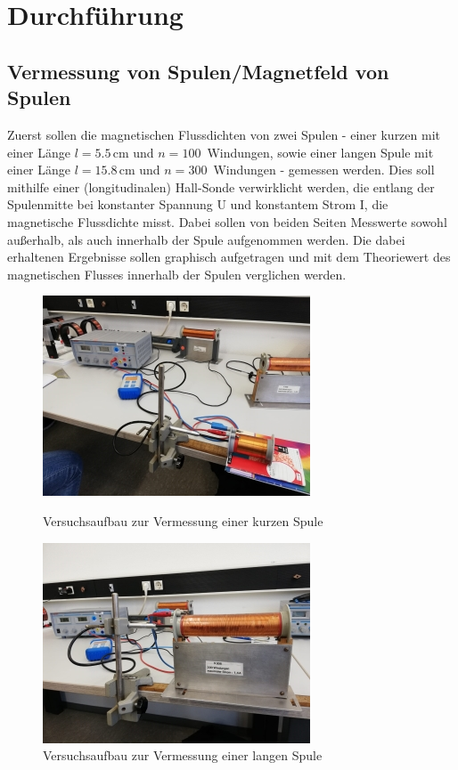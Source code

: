 \section{Durchführung}
\label{sec:Durchführung}

\subsection{Vermessung von Spulen/Magnetfeld von Spulen}

Zuerst sollen die magnetischen Flussdichten von zwei Spulen - einer kurzen mit einer Länge 
$l = 5.5\, \si{\centi\meter}$ und $n = 100\,$ Windungen, sowie einer langen Spule mit einer Länge
$l = 15.8\, \si{\cm}$ und $n = 300\,$ Windungen - gemessen werden. Dies soll mithilfe einer
(longitudinalen) Hall-Sonde verwirklicht werden, die entlang der Spulenmitte bei konstanter Spannung U und konstantem
Strom I, die magnetische Flussdichte misst. Dabei sollen von beiden Seiten Messwerte sowohl außerhalb, als auch
innerhalb der Spule aufgenommen werden.
Die dabei erhaltenen Ergebnisse sollen graphisch aufgetragen und mit dem Theoriewert des magnetischen Flusses
innerhalb der Spulen verglichen werden.

\begin{figure}[H]
    \centering
    \includegraphics{Spule2.jpg}
    \caption{Versuchsaufbau zur Vermessung einer kurzen Spule }
    \label{KurzeSpule}
    \includegraphics{Spule1.jpg}
    \caption{Versuchsaufbau zur Vermessung einer langen Spule }
    \label{LangeSpule}
\end{figure}


